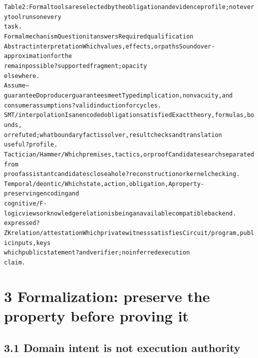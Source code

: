 \begingroup\fontsize{7}{8.4}\selectfont
\begin{alltt}
Table 2: Formal tools are selected by the obligation and evidence profile; not every tool runs on every
task.
Formal mechanism            Question it answers                   Required qualification
Abstract interpretation     Which values, effects, or paths       Sound over-approximation for the
                            remain possible?                      supported fragment; opacity
                                                                  elsewhere.
Assume–guarantee            Do producer guarantees meet           Typed implication, nonvacuity, and
                            consumer assumptions?                 valid induction for cycles.
SMT / interpolation         Is an encoded obligation satisfied    Exact theory, formulas, bounds,
                            or refuted; what boundary fact is     solver, result checks and translation
                            useful?                               profile.
Tactician / Hammer /        Which premises, tactics, or proof     Candidate search separated from
proof assistant             candidates close a hole?              reconstruction or kernel checking.
Temporal / deontic /        Which state, action, obligation,      A property-preserving encoding and
cognitive / F-logic views   or knowledge relation is being        an available compatible backend.
                            expressed?
ZK relation / attestation   Which private witness satisfies       Circuit/program, public inputs, keys
                            which public statement?               and verifier; no inferred execution
                                                                  claim.
\end{alltt}\endgroup



\section*{3 Formalization: preserve the property before proving it}

\subsection*{3.1 Domain intent is not execution authority}

